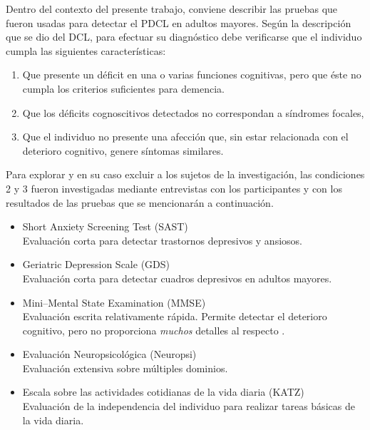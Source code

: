 \documentclass[12pt,letterpaper]{book}
\begin{document}
Dentro del contexto del presente trabajo, conviene describir las pruebas que fueron usadas para detectar el PDCL en adultos mayores.
%
Según la descripción que se dio del DCL, para efectuar su diagnóstico debe verificarse que el individuo cumpla las siguientes características:
\begin{enumerate}
\item Que presente un déficit en una o varias funciones cognitivas, pero que éste no cumpla los criterios suficientes para demencia.
\item Que los déficits cognoscitivos detectados no correspondan a síndromes focales,
\item Que el individuo no presente una afección que, sin estar relacionada con el deterioro cognitivo, genere síntomas similares.
\end{enumerate}
%
Para explorar y en su caso excluir a los sujetos de la investigación, las condiciones 2 y 3 fueron investigadas mediante entrevistas con los participantes y con los resultados de las pruebas que se mencionarán a continuación.
%
%
\begin{itemize}
\item {Short Anxiety Screening Test (SAST)}\\ 
Evaluación corta para detectar trastornos depresivos y ansiosos. \cite{sinoff99}

\item {Geriatric Depression Scale (GDS)}\\
Evaluación corta para detectar cuadros depresivos en adultos mayores. \cite{Yesavage82}

\item {Mini--Mental State Examination (MMSE)}\\
Evaluación escrita relativamente rápida. Permite detectar el deterioro cognitivo, pero no proporciona \textit{muchos} detalles al respecto \cite{folstein75}. %

\item {Evaluación Neuropsicológica (Neuropsi)}\\
Evaluación extensiva sobre múltiples dominios. \cite{Solis03}

\item {Escala sobre las actividades cotidianas de la vida diaria (KATZ)}\\
Evaluación de la independencia del individuo para realizar tareas básicas de la vida diaria.   \cite{katz70} %
\end{itemize}
\end{document}
